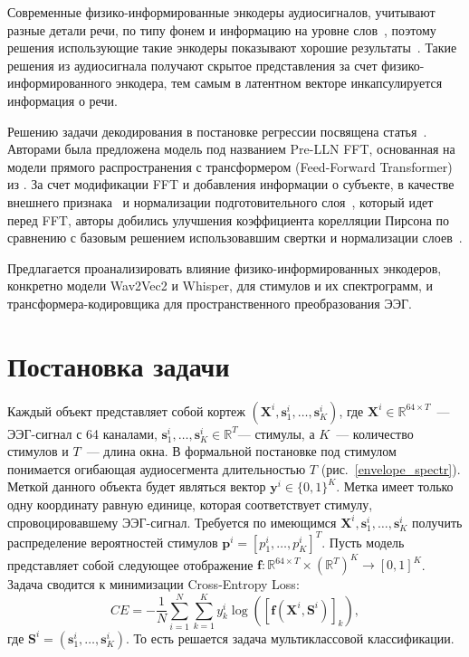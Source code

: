 \documentclass{article}
\begin{document}
    \par 
    Современные физико-информированные энкодеры аудиосигналов, учитывают разные детали речи, по типу фонем и информацию на уровне слов~\citep{vaidya2022selfsupervised}, поэтому решения использующие такие энкодеры показывают хорошие результаты~\citep{Wang2024SelfsupervisedSR}. Такие решения из аудиосигнала получают скрытое представления за счет физико-информированного энкодера, тем самым в латентном векторе инкапсулируется информация о речи.
    \par
    Решению задачи декодирования в постановке регрессии посвящена статья~\cite{piao2023happyquokka}. Авторами была предложена модель под названием Pre-LLN FFT, основанная на модели прямого распространения с трансформером (Feed-Forward Transformer) из \citep{ren2019fastspeech}. За счет модификации FFT и добавления информации о субъекте, в качестве внешнего признака~\citep{vandenoord16_ssw} и нормализации подготовительного слоя~\citep{xiong2020layer}, который идет перед FFT, авторы добились улучшения коэффициента корелляции Пирсона по сравнению с базовым решением использовавшим свертки и нормализации слоев~\citep{vlaai}. 

    Предлагается проанализировать влияние физико-информированных энкодеров, конкретно модели Wav2Vec2 и Whisper, для стимулов и их спектрограмм, и трансформера-кодировщика для пространственного преобразования ЭЭГ.
    

\section{Постановка задачи}    
    Каждый объект представляет собой кортеж $(\mathbf{X}^i, \mathbf{s}_1^i, \dots, \mathbf{s}_K^i)$, где $\mathbf{X}^i \in \mathbb{R}^{64 \times T}$~--- ЭЭГ-сигнал с 64 каналами, $\mathbf{s}_1^i, \dots, \mathbf{s}_K^i \in \mathbb{R}^{T}$--- стимулы, а $K$~--- количество стимулов и $T$~--- длина окна. В формальной постановке под стимулом понимается огибающая аудиосегмента длительностью $T$ (рис.~\ref{envelope_spectr}). Меткой данного объекта будет являться вектор $\mathbf{y}^i \in \{0, 1\}^K$. Метка имеет только одну координату равную единице, которая соответствует стимулу, спровоцировавшему ЭЭГ-сигнал. Требуется по имеющимся $\mathbf{X}^i, \mathbf{s}_1^i, \dots, \mathbf{s}_K^i$ получить распределение вероятностей стимулов $\mathbf{p}^i = [p_1^i, \dots , p_K^i]^T$. Пусть модель представляет собой следующее отображение $\mathbf{f} : \mathbb{R}^{64 \times T} \times \left( \mathbb{R}^{T} \right)^K \rightarrow [0,1]^K$. Задача сводится к минимизации Cross-Entropy Loss:
    $$CE = - \frac{1}{N}\sum_{i=1}^N\sum_{k=1}^K y_k^i \log \left( \left[ \mathbf{f}(\mathbf{X}^i, \mathbf{S}^i) \right]_k \right),$$
    где $\mathbf{S}^i = (\mathbf{s}^i_1, \dots, \mathbf{s}^i_K)$. То есть решается задача мультиклассовой классификации.
\end{document}
